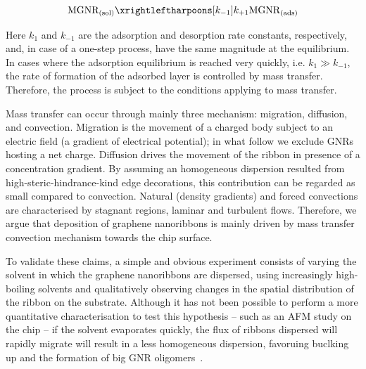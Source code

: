 \begin{equation}
  \label{eq:absorption}
  \textrm{MGNR}_\textrm{(sol)} \xrightleftharpoons[k_{-1}]{k_{+1}} \textrm{MGNR}_\textrm{(ads)}
\end{equation}

Here $k_1$ and $k_{-1}$ are the adsorption and desorption rate constants, respectively, and, in case of a one-step process, have the same magnitude at the equilibrium. In cases where the adsorption equilibrium is reached very quickly, i.e. $k_1 \gg k_{-1}$, the rate of formation of the adsorbed layer is controlled by mass transfer. Therefore, the process is subject to the conditions applying to mass transfer.

Mass transfer can occur through mainly three mechanism: migration, diffusion, and convection. Migration is the movement of a charged body subject to an electric field (a gradient of electrical potential); in what follow we exclude \glspl{GNR} hosting a net charge. Diffusion drives the movement of the ribbon in presence of a concentration gradient. By assuming an homogeneous dispersion resulted from high-steric-hindrance-kind edge decorations, this contribution can be regarded as small compared to convection. Natural (density gradients) and forced convections are characterised by stagnant regions, laminar and turbulent flows. Therefore, we argue that deposition of graphene nanoribbons is mainly driven by mass transfer convection mechanism towards the chip surface.

To validate these claims, a simple and obvious experiment consists of varying the solvent in which the graphene nanoribbons are dispersed, using increasingly high-boiling solvents and qualitatively observing changes in the spatial distribution of the ribbon on the substrate. Although it has not been possible to perform a more quantitative characterisation to test this hypothesis -- such as an AFM study on the chip -- if the solvent evaporates quickly, the flux of ribbons dispersed will rapidly migrate will result in a less homogeneous dispersion, favoruing buclking up and the formation of big GNR oligomers~\cite{limburg2018anchor}.



